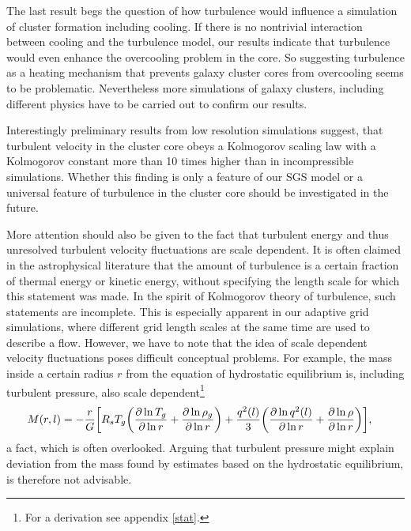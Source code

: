 The last result begs the question of how turbulence would influence a
simulation of cluster formation including cooling. If there is no nontrivial
interaction between cooling and the turbulence model, our results indicate that
turbulence would even enhance the overcooling problem in the core. So
suggesting turbulence as a heating mechanism that prevents galaxy cluster
cores from overcooling seems to be problematic. Nevertheless more
simulations of galaxy clusters, including different physics have to
be carried out to confirm our results. 

Interestingly preliminary results from low resolution simulations suggest, that
turbulent velocity in the cluster core obeys a Kolmogorov scaling law with
a Kolmogorov constant more than 10 times higher than in incompressible
simulations. Whether this finding is only a feature of our SGS model
or a universal feature of turbulence in the cluster core should be
investigated in the future.

More attention should also be given to the fact that turbulent energy and
thus unresolved turbulent velocity fluctuations are scale dependent. It is
often claimed in the astrophysical literature that the amount of
turbulence is a certain fraction of thermal energy or kinetic energy, without
specifying the length scale for which this statement was made. In the spirit of
Kolmogorov theory of turbulence, such statements are incomplete. This is
especially apparent in our adaptive grid simulations, where different grid
length scales at the same time are used to describe a flow. However, we have to
note that the idea of scale dependent velocity fluctuations poses
difficult conceptual problems. For example, the mass inside a certain radius $r$
from the equation of hydrostatic equilibrium is, including turbulent pressure,
also scale dependent\footnote{For a derivation see appendix \ref{stat}.}
\begin{align}
M(r,l) &= - \frac{r}{G} 
\lrb{R_s T_g \lra{\ppd{\ln r}{\ln T_g}+\ppd{\ln r}{\ln \rho_g}}
+\frac{q^2(l)}{3}\lra{\ppd{\ln r}{\ln q^2(l)}+\ppd{\ln r}{\ln \rho}}},
\end{align}
a fact, which is often overlooked. Arguing that turbulent pressure might
explain deviation from the mass found by estimates based on the hydrostatic
equilibrium, is therefore not advisable.

